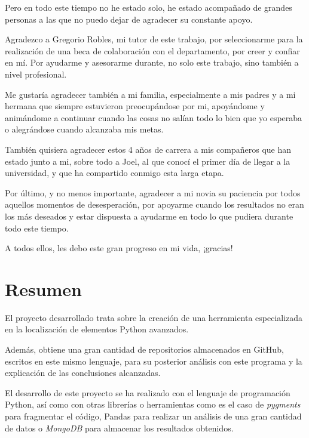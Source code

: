 \documentclass[a4paper, 12pt]{book}
\begin{document}
Pero en todo este tiempo no he estado solo, he estado acompañado de grandes personas a las que no puedo dejar de agradecer su constante apoyo.

Agradezco a Gregorio Robles, mi tutor de este trabajo, por seleccionarme para la realización de una beca de colaboración con el departamento, por creer y confiar en mí. Por ayudarme y asesorarme durante, no solo este trabajo, sino también a nivel profesional.

Me gustaría agradecer también a mi familia, especialmente a mis padres y a mi hermana que siempre estuvieron preocupándose por mi, apoyándome y animándome a continuar cuando las cosas no salían todo lo bien que yo esperaba o alegrándose cuando alcanzaba mis metas.

También quisiera agradecer estos 4 años de carrera a mis compañeros que han estado junto a mi, sobre todo a Joel, al que conocí el primer día de llegar a la universidad, y que ha compartido conmigo esta larga etapa.

Por último, y no menos importante, agradecer a mi novia su paciencia por todos aquellos momentos de desesperación, por apoyarme cuando los resultados no eran los más deseados y estar dispuesta a ayudarme en todo lo que pudiera durante todo este tiempo.

A todos ellos, les debo este gran progreso en mi vida, ¡gracias!



\chapter*{Resumen}

El proyecto desarrollado trata sobre la creación de una herramienta especializada en la localización de elementos Python avanzados.

Además, obtiene una gran cantidad de repositorios almacenados en GitHub, escritos en este mismo lenguaje, para su posterior análisis con este programa y la explicación de las conclusiones alcanzadas.

El desarrollo de este proyecto se ha realizado con el lenguaje de programación Python, así como con otras librerías o herramientas como es el caso de \textit{pygments} para fragmentar el código, Pandas para realizar un análisis de una gran cantidad de datos o \textit{MongoDB} para almacenar los resultados obtenidos.
\end{document}
